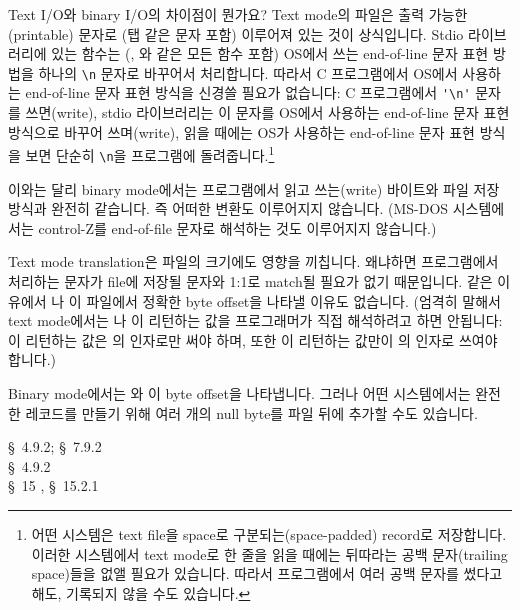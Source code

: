 \begin{faq}
	Text I/O와 binary I/O의 차이점이 뭔가요?
\A
	Text mode의 파일은 출력 가능한(printable) 문자로 (탭 같은 문자 포함)
	이루어져 있는 것이 상식입니다.
	Stdio 라이브러리에 있는 함수는 (, 와 같은 모든
	함수 포함) OS에서 쓰는 end-of-line 문자 표현 방법을 하나의
	\verb+\n+ 문자로 바꾸어서 처리합니다.  따라서 C 프로그램에서
	OS에서 사용하는 end-of-line 문자 표현 방식을 신경쓸 필요가 없습니다:
	C 프로그램에서 \verb+'\n'+ 문자를 쓰면(write), stdio 라이브러리는
	이 문자를 OS에서 사용하는 end-of-line 문자 표현 방식으로 바꾸어
	쓰며(write), 읽을 때에는 OS가 사용하는 end-of-line 문자 표현 방식을
	보면 단순히 \verb+\n+을 프로그램에 돌려줍니다.\footnote{어떤 시스템은
	text file을 space로 구분되는(space-padded) record로 저장합니다.
	이러한 시스템에서 text mode로 한 줄을 읽을 때에는 뒤따라는
	공백 문자(trailing space)들을 없앨 필요가 있습니다. 따라서
	프로그램에서 여러 공백 문자를 썼다고 해도, 기록되지 않을 수도
	있습니다.}
%
%
%
	
	이와는 달리 binary mode에서는 프로그램에서 읽고 쓰는(write) 바이트와
	파일 저장 방식과 완전히 같습니다. 즉 어떠한 변환도 이루어지지 않습니다.
	(MS-DOS 시스템에서는 control-Z를 end-of-file 문자로 해석하는 것도
	이루어지지 않습니다.)

	Text mode translation은 파일의 크기에도 영향을 끼칩니다.
	왜냐하면 프로그램에서 처리하는 문자가 file에 저장될 문자와 1:1로
	match될 필요가 없기 때문입니다.  같은 이유에서 나
	이 파일에서 정확한 byte offset을 나타낼 이유도 없습니다.
	(엄격히 말해서 text mode에서는 나 이 리턴하는
	값을 프로그래머가 직접 해석하려고 하면 안됩니다: 이
	리턴하는 값은 의 인자로만 써야 하며, 또한 이
	리턴하는 값만이 의 인자로 쓰여야 합니다.)

	Binary mode에서는 와 이 byte offset을 나타냅니다.
	그러나 어떤 시스템에서는 완전한 레코드를 만들기 위해 여러 개의
	null byte를 파일 뒤에 추가할 수도 있습니다.


\R
	\cite{ansi} \S\ 4.9.2; \cite{c89} \S\ 7.9.2 \\
	\cite{rationale} \S\ 4.9.2 \\
	\cite{hs} \S\ 15 , \S\ 15.2.1 
\end{faq}

